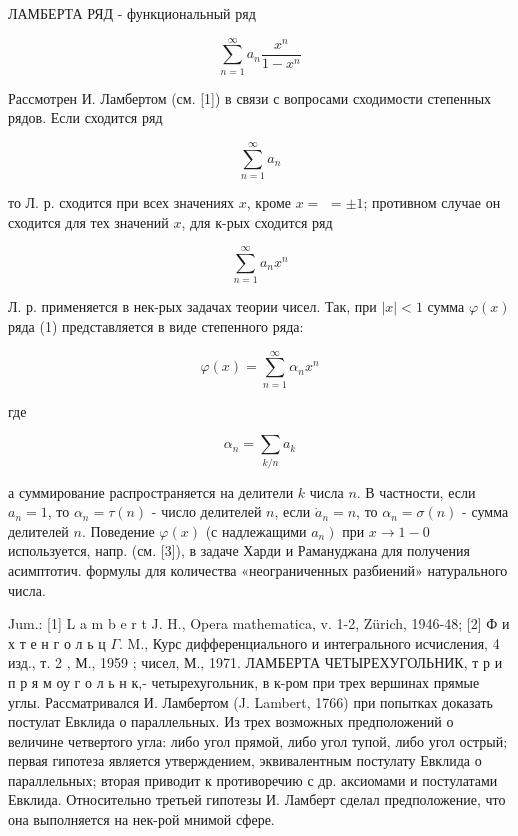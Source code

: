 \documentclass[10pt]{article}
\begin{document}
ЛАМБЕРТА РЯД - функциональный ряд



\[

\sum_{n=1}^{\infty} a_{n} \frac{x^{n}}{1-x^{n}}

\]



Рассмотрен И. Ламбертом (см. [1]) в связи с вопросами сходимости степенных рядов. Если сходится ряд



\[

\sum_{n=1}^{\infty} a_{n}

\]



то Л. р. сходится при всех значениях $x$, кроме $x=$ $= \pm 1$; противном случае он сходится для тех значений $x$, для к-рых сходится ряд



\[

\sum_{n=1}^{\infty} a_{n} x^{n}

\]



Л. р. применяется в нек-рых задачах теории чисел. Так, при $|x|<1$ сумма $\varphi(x)$ ряда (1) представляется в виде степенного ряда:



\[

\varphi(x)=\sum_{n=1}^{\infty} \alpha_{n} x^{n}

\]



где



\[

\alpha_{n}=\sum_{k / n} a_{k}

\]



а суммирование распространяется на делители $k$ числа $n$. В частности, если $a_{n}=1$, то $\alpha_{n}=\tau(n)$ - число делителей $n$, если $\dot{a}_{n}=n$, то $\alpha_{n}=\sigma(n)$ - сумма делителей $n$. Поведение $\varphi(x)$ (с надлежащими $\left.a_{n}\right)$ при $x \rightarrow 1-0$ используется, напр. (см. [3]), в задаче Харди и Рамануджана для получения асимптотич. формулы для количества «неограниченных разбиений» натурального числа.



Jum.: [1] L a m b e r t J. H., Opera mathematica, v. 1-2, Zürich, 1946-48; [2] Ф и х т е н г о л ь ц $\Gamma$. M., Курс дифференциального и интегрального исчисления, 4 изд., т. 2 , М., 1959 ; чисел, М., 1971. ЛАМБЕРТА ЧЕТЫРЕХУГОЛЬНИК, т р и п р я м оу г о л ь н к,- четырехугольник, в к-ром при трех вершинах прямые углы. Рассматривался И. Ламбертом (J. Lambert, 1766) при попытках доказать постулат Евклида о параллельных. Из трех возможных предположений о величине четвертого угла: либо угол прямой, либо угол тупой, либо угол острый; первая гипотеза является утверждением, эквивалентным постулату Евклида о параллельных; вторая приводит к противоречию с др. аксиомами и постулатами Евклида. Относительно третьей гипотезы И. Ламберт сделал предположение, что она выполняется на нек-рой мнимой сфере.
\end{document}

